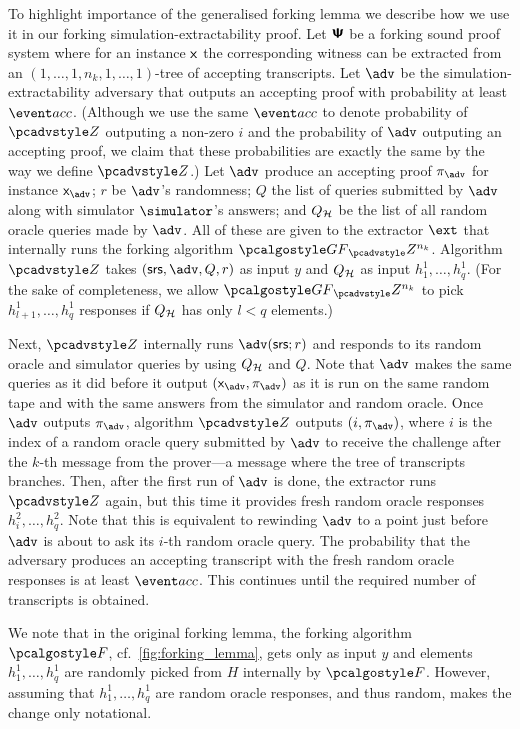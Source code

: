 \documentclass[runningheads,11pt]{llncs}
\begin{document}
To highlight importance of the generalised forking lemma we describe how we use
it in our forking simulation-extractability proof.  Let $\bm{\mathsf{\Psi}}$ be a
forking sound proof system where for an instance $\mathsf{x}$ the
corresponding witness can be extracted from an
$(1, \ldots, 1, n_k, 1, \ldots, 1)$-tree of accepting transcripts.  Let $\advse$
be the simulation-extractability adversary that outputs an accepting proof with
probability at least $\accProb$. (Although we use the same $\accProb$ to denote
probability of $\zdv$ outputing a non-zero $i$ and the probability of $\advse$
outputing an accepting proof, we claim that these probabilities are exactly the
same by the way we define $\zdv$.)  Let $\advse$ produce an accepting
proof $\zkproof_{\advse}$ for instance $\inp_{\advse}$; $r$ be $\advse$'s
randomness; $Q$ the list of queries submitted by $\advse$ along with simulator
$\simulator$'s answers; and $Q_{\mathcal{H}}$ be the list of all random oracle
queries made by $\advse$.  All of these are given to the extractor $\ext$ that
internally runs the forking algorithm $\genforking_\zdv^{n_k}$.  Algorithm $\zdv$
takes $(\srs, \advse,
Q, r)$ as input $y$ and $Q_{\mathcal{H}}$ as input $h_1^1, \ldots,
h_q^1$. 
(For the sake of completeness, we allow $\genforking_\zdv^{n_k}$ to
pick $h^1_{l + 1}, \ldots, h^1_q$ responses if $Q_{\mathcal{H}}$ has only $l < q$
elements.)  

Next, $\zdv$ internally runs $\advse(\srs; r)$ and responds to its random
oracle and simulator queries by using $Q_{\mathcal{H}}$ and $Q$. Note that $\advse$ makes
the same queries as it did before it output $(\inp_{\advse}, \zkproof_{\advse})$
as it is run on the same random tape and with the same answers from the
simulator and random oracle. Once $\advse$ outputs 
$\zkproof_{\advse}$, algorithm $\zdv$ outputs $(i, \zkproof_{\advse})$, where
$i$ is the index of a random oracle query submitted by $\advse$ to receive the challenge after the
$k$-th message from the prover---a message where the tree of transcripts
branches.
Then, after the first run of $\advse$ is done, the extractor runs $\zdv$ again,
but this time it provides fresh random oracle responses $h^2_i, \ldots,
h^2_q$. Note that this is equivalent to rewinding $\advse$ to a point just
before $\advse$ is about to ask its $i$-th random oracle
query. The probability that the adversary produces an accepting transcript with the
fresh random oracle responses is at least $\accProb$. This continues until the
required number of transcripts is obtained. 

We note that in the original forking lemma, the forking algorithm $\forking$,
cf.~\cref{fig:forking_lemma}, gets only as input $y$ and elements $h^1_1, \ldots,
h^1_q$ are randomly picked from $H$ internally by $\forking$. However, assuming
that $h^1_1, \ldots, h^1_q$ are random oracle responses, and thus random, makes
the change only notational.
\end{document}
